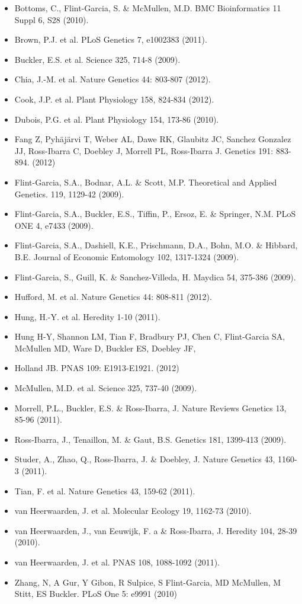 \begin{itemize}  \itemsep0em\item Bottoms, C., Flint-Garcia, S. \& McMullen, M.D.  BMC Bioinformatics 11 Suppl 6, S28 (2010).
\item Brown, P.J. et al.  PLoS Genetics 7, e1002383 (2011).
\item Buckler, E.S. et al. Science 325, 714-8 (2009).
\item Chia, J.-M. et al. Nature Genetics 44: 803-807 (2012).
\item Cook, J.P. et al.  Plant Physiology 158, 824-834 (2012).
\item Dubois, P.G. et al. Plant Physiology 154, 173-86 (2010). 
\item Fang Z, Pyh\"aj\"arvi T, Weber AL, Dawe RK, Glaubitz JC, Sanchez Gonzalez JJ, Ross-Ibarra C, Doebley J, Morrell PL, Ross-Ibarra J. Genetics 191: 883-894. (2012)
\item Flint-Garcia, S.A., Bodnar, A.L. \& Scott, M.P.  Theoretical and Applied Genetics. 119, 1129-42 (2009).
\item Flint-Garcia, S.A., Buckler, E.S., Tiffin, P., Ersoz, E. \& Springer, N.M.  PLoS ONE 4, e7433 (2009).
\item Flint-Garcia, S.A., Dashiell, K.E., Prischmann, D.A., Bohn, M.O. \& Hibbard, B.E. Journal of Economic Entomology 102, 1317-1324 (2009).
\item Flint-Garcia, S., Guill, K. \& Sanchez-Villeda, H. Maydica 54, 375-386 (2009).
\item Hufford, M. et al. Nature Genetics 44: 808-811 (2012).
\item Hung, H.-Y. et al.  Heredity 1-10 (2011).
\item Hung H-Y, Shannon LM, Tian F, Bradbury PJ, Chen C, Flint-Garcia SA, McMullen MD, Ware D, Buckler ES, Doebley JF, \item Holland JB. PNAS 109: E1913-E1921. (2012)
\item McMullen, M.D. et al. Science 325, 737-40 (2009).
\item Morrell, P.L., Buckler, E.S. \& Ross-Ibarra, J. Nature Reviews Genetics 13, 85-96 (2011).
\item Ross-Ibarra, J., Tenaillon, M. \& Gaut, B.S. Genetics 181, 1399-413 (2009).
\item Studer, A., Zhao, Q., Ross-Ibarra, J. \& Doebley, J.  Nature Genetics 43, 1160-3 (2011).
\item Tian, F. et al.  Nature Genetics 43, 159-62 (2011).
\item van Heerwaarden, J. et al. Molecular Ecology 19, 1162-73 (2010).
\item van Heerwaarden, J., van Eeuwijk, F. a \& Ross-Ibarra, J.  Heredity 104, 28-39 (2010).
\item van Heerwaarden, J. et al. PNAS 108, 1088-1092 (2011).
\item Zhang, N, A Gur, Y Gibon, R Sulpice, S Flint-Garcia, MD McMullen, M Stitt, ES Buckler.  PLoS One 5: e9991 (2010)
\end{itemize}
